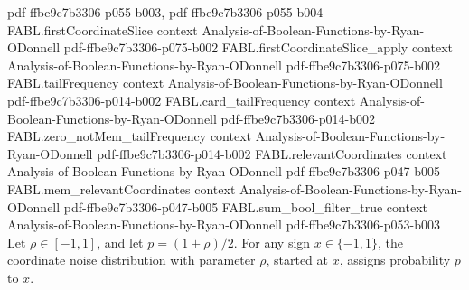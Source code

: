 \begin{theorem}
  {pdf-ffbe9c7b3306-p055-b003,
    pdf-ffbe9c7b3306-p055-b004}
\proofstep
  {FABL.firstCoordinateSlice}
  {context}
  {Analysis-of-Boolean-Functions-by-Ryan-ODonnell}
  {pdf-ffbe9c7b3306-p075-b002}
\proofstep
  {FABL.firstCoordinateSlice_apply}
  {context}
  {Analysis-of-Boolean-Functions-by-Ryan-ODonnell}
  {pdf-ffbe9c7b3306-p075-b002}
\proofstep
  {FABL.tailFrequency}
  {context}
  {Analysis-of-Boolean-Functions-by-Ryan-ODonnell}
  {pdf-ffbe9c7b3306-p014-b002}
\proofstep
  {FABL.card_tailFrequency}
  {context}
  {Analysis-of-Boolean-Functions-by-Ryan-ODonnell}
  {pdf-ffbe9c7b3306-p014-b002}
\proofstep
  {FABL.zero_notMem_tailFrequency}
  {context}
  {Analysis-of-Boolean-Functions-by-Ryan-ODonnell}
  {pdf-ffbe9c7b3306-p014-b002}
\proofstep
  {FABL.relevantCoordinates}
  {context}
  {Analysis-of-Boolean-Functions-by-Ryan-ODonnell}
  {pdf-ffbe9c7b3306-p047-b005}
\proofstep
  {FABL.mem_relevantCoordinates}
  {context}
  {Analysis-of-Boolean-Functions-by-Ryan-ODonnell}
  {pdf-ffbe9c7b3306-p047-b005}
\proofstep
  {FABL.sum_bool_filter_true}
  {context}
  {Analysis-of-Boolean-Functions-by-Ryan-ODonnell}
  {pdf-ffbe9c7b3306-p053-b003}
Let $\rho\in[-1,1]$, and let $p=(1+\rho)/2$. For any sign $x\in\{−1,1\}$, the coordinate
noise distribution with parameter $\rho$, started at $x$, assigns probability $p$ to
$x$.
\end{theorem}

